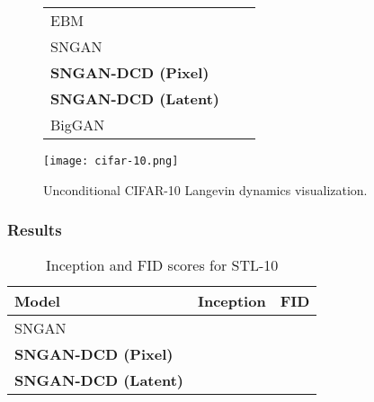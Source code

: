 \documentclass{article}
\begin{document}
\begin{figure*}[t]
\begin{minipage}{0.55\textwidth}
\begin{center}
\begin{adjustbox}{max width=.9\linewidth}
\begin{tabular}{lcc}
        EBM~\cite{du2019implicit} &  &  \\
        SNGAN~\cite{miyato2018spectral} &  & \\
        \textbf{SNGAN-DCD (Pixel)} & {} & \\
        \textbf{SNGAN-DCD (Latent)} & {} & \\
        BigGAN~\cite{brock2018large} &  & \\
        \bottomrule
    \end{tabular}
\end{adjustbox}
\end{center}
 \label{tab:score-cifar}
\end{minipage}
\hspace{+5pt}
\begin{minipage}{0.4\textwidth}
    \centering
    \texttt{[image: cifar-10.png]}
\caption{Unconditional CIFAR-10 Langevin dynamics visualization.}
    \label{fig:mcmc-cifar}
\end{minipage}
\end{figure*}

\subsubsection{Results}

\begin{wraptable}{r}{0.5\textwidth}
\vspace{-10pt}
\begin{center}
\begin{adjustbox}{max width=1.2\linewidth}
\begin{tabular}{lcc}
        \toprule
        Model & Inception & FID\\
        \midrule
        SNGAN~\cite{miyato2018spectral} &  &  \\
        \textbf{SNGAN-DCD (Pixel)} & {} & \\
        \textbf{SNGAN-DCD (Latent)} & {} & \\
        \bottomrule
    \end{tabular} 
\end{adjustbox}
\end{center}
\caption{Inception and FID scores for STL-10} \label{tab:score-stl}
\end{wraptable}
\end{document}
